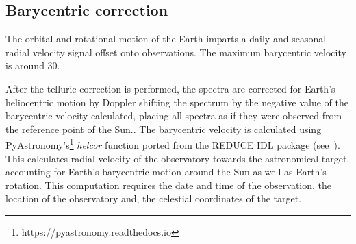 

\subsection{Barycentric correction}
The orbital and rotational motion of the Earth imparts a daily and seasonal radial velocity signal offset onto observations. The maximum barycentric velocity is around 30\kmps{}.

After the telluric correction is performed, the spectra are corrected for Earth's heliocentric motion by Doppler shifting the spectrum by the negative value of the barycentric velocity calculated, placing all spectra as if they were observed from the reference point of the Sun.. The barycentric velocity is calculated using PyAstronomy's\footnote{https://pyastronomy.readthedocs.io} \emph{helcor} function ported from the REDUCE IDL package (see~\citet[][]{piskunov_new_2002}). This calculates radial velocity of the observatory towards the astronomical target, accounting for Earth's barycentric motion around the Sun as well as Earth's rotation. This computation requires the date and time of the observation, the location of the observatory and, the celestial coordinates of the target.
